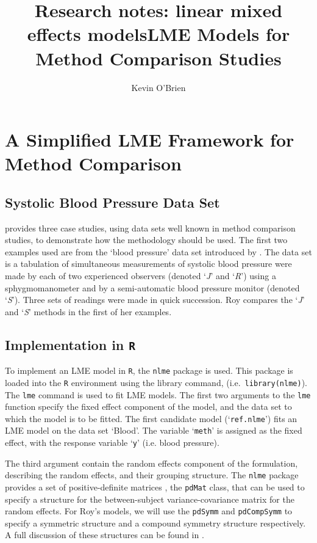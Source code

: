 \documentclass[12pt, a4paper]{report}
\title{Research notes: linear mixed effects models}
\author{ } \date{ }
\theoremstyle{plain}
\theoremstyle{definition}
\theoremstyle{remark}
\begin{document}
\author{Kevin O'Brien}
\title{LME Models for Method Comparison Studies}

\chapter{A Simplified LME Framework for Method Comparison}


\section{Systolic Blood Pressure Data Set}

\citet{ARoy2009} provides three case studies, using data sets well known in method comparison studies, to demonstrate how the methodology should be used. The first two examples used are from the `blood pressure' data set introduced by \citet{BA99}. The data set is a tabulation of simultaneous measurements of systolic blood pressure were made by each of two experienced observers (denoted `\textit{J}' and `\textit{R}') using a sphygmomanometer and by a semi-automatic blood pressure monitor (denoted `\textit{S}'). Three sets of readings were made in quick succession. Roy compares the `\textit{J}' and `\textit{S}' methods in the first of her examples.

\section{Implementation in \texttt{R}}
To implement an LME model in \texttt{R}, the \texttt{nlme} package is used. This package is loaded into the \texttt{R} environment using the library command, (i.e.\ \texttt{library(nlme)}). The \texttt{lme} command is used to fit LME models. The first two arguments to the \texttt{lme} function specify the fixed effect component of the model, and the data set to which the model is to be fitted. The first candidate model (`\texttt{ref.nlme}') fits an LME model on the data set `Blood'. The variable `\texttt{meth}' is assigned as the fixed effect, with the response variable `\texttt{y}' (i.e. blood pressure).

The third argument contain the random effects component of the formulation, describing the random effects, and their grouping structure. The \texttt{nlme} package provides a set of positive-definite matrices , the \texttt{pdMat} class, that can be used to specify a structure for the between-subject variance-covariance matrix for the random effects. For Roy's models, we will use the \texttt{pdSymm} and \texttt{pdCompSymm} to specify a symmetric structure and a compound symmetry structure respectively. A full discussion of these structures can be found in \citet[pg. 158]{PB}.
\end{document}
